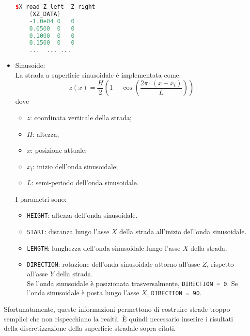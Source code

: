 \begin{itemize}
\begin{lstlisting}[language = C++, basicstyle=\ttfamily\small, basewidth=0.55em]
	$X_road	Z_left	Z_right
	(XZ_DATA)
	-1.0e04	0	0
	0.0500	0	0
	0.1000	0	0
	0.1500	0	0
	...  ... ...
	\end{lstlisting}
	\item Sinusoide:\\
	La strada a superficie sinusoidale è implementata come:
	\begin{equation}
	z(x)=\frac{H}{2}\left( 1 - \cos \left( \frac{2\pi \cdot (x-x_i)}{L} \right)   \right) 
	\end{equation}
	dove	
	\begin{itemize}
	 	\item $z$: coordinata verticale della strada;
	 	\item $H$: altezza;
	 	\item $x$: posizione attuale;
	 	\item $x_i$: inizio dell'onda sinusoidale;
	 	\item $L$: semi-periodo dell'onda sinusoidale.
	\end{itemize}
	I parametri sono:	
	\begin{itemize}
		\item \texttt{HEIGHT}: altezza dell'onda sinusoidale.
		\item \texttt{START}: distanza lungo l'asse $X$ della strada all'inizio dell'onda sinusoidale.
		\item \texttt{LENGTH}: lunghezza dell'onda sinusoidale lungo l'asse $X$ della strada.
		\item \texttt{DIRECTION}: rotazione dell'onda sinusoidale attorno all'asse $Z$, rispetto all'asse $Y$ della strada.\\
		Se l'onda sinusoidale è posizionata trasversalmente, \texttt{DIRECTION = 0}. Se l'onda sinusoidale è posta lungo l'asse $X$, \texttt{DIRECTION = 90}.
	\end{itemize}
\end{itemize}
Sfortunatamente, queste informazioni permettono di costruire strade troppo semplici che non rispecchiano la realtà. È quindi necessario inserire i risultati della discretizzazione della superficie stradale sopra citati.

